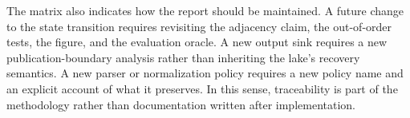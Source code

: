The matrix also indicates how the report should be maintained. A future change to the state transition requires revisiting the adjacency claim, the out-of-order tests, the figure, and the evaluation oracle. A new output sink requires a new publication-boundary analysis rather than inheriting the lake's recovery semantics. A new parser or normalization policy requires a new policy name and an explicit account of what it preserves. In this sense, traceability is part of the methodology rather than documentation written after implementation.
